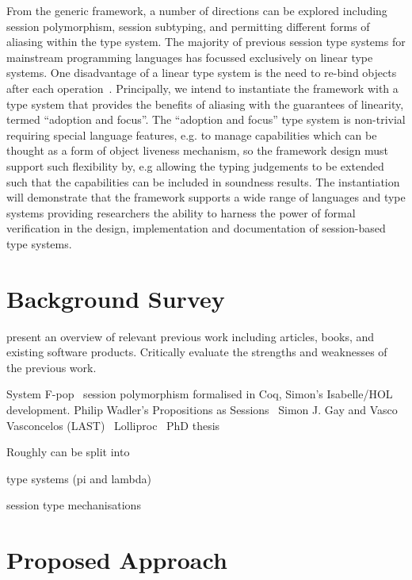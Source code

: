 \documentclass{mprop}
\begin{document}
From the generic framework, a number of directions can be explored including
session polymorphism, session subtyping, and permitting different forms of
aliasing within the type system. The majority of previous session type systems
for mainstream programming languages has focussed exclusively on linear type
systems. One disadvantage of a linear type system is the need to re-bind
objects after each operation~\cite{Gay:2010:LAST}. Principally, we intend to
instantiate the framework with a type system that provides the benefits of
aliasing with the guarantees of linearity, termed ``adoption and focus''. The
``adoption and focus'' type system is non-trivial requiring special language
features, e.g. to manage capabilities which can be thought as a form of object
liveness mechanism, so the framework design must support such flexibility by,
e.g allowing the typing judgements to be extended such that the capabilities
can be included in soundness results. The instantiation will demonstrate that
the framework supports a wide range of languages and type systems providing
researchers the ability to harness the power of formal verification in the
design, implementation and documentation of session-based type systems.

\section{Background Survey}

present an overview of relevant previous work including articles, books, and
existing software products. Critically evaluate the strengths and weaknesses
of the previous work.

System F-pop~\cite{Mazurak:2010:LLT}
session polymorphism formalised in Coq, Simon's Isabelle/HOL
development.
Philip Wadler's Propositions as Sessions~\cite{Wadler:2012}
Simon J. Gay and Vasco Vasconcelos (LAST)~\cite{Gay:2010:LAST}
Lolliproc~\cite{Mazurak:2010:LCC}
PhD thesis~\cite{Mazurak:2013:LPP}

Roughly can be split into

type systems (pi and lambda)

session type mechanisations

\section{Proposed Approach}
\end{document}
